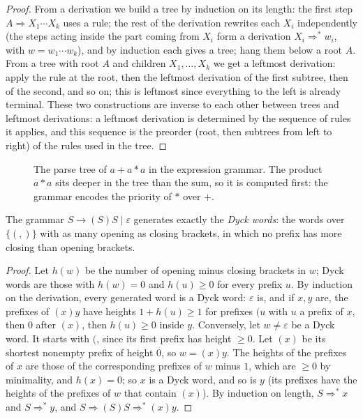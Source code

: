 \begin{proof}
From a derivation we build a tree by induction on its length: the first step $A\Rightarrow X_1\cdots X_k$ uses a rule; the rest of the derivation rewrites each $X_i$ independently (the steps acting inside the part coming from $X_i$ form a derivation $X_i\Rightarrow^*w_i$, with $w=w_1\cdots w_k$), and by induction each gives a tree; hang them below a root $A$. From a tree with root $A$ and children $X_1,\dots,X_k$ we get a leftmost derivation: apply the rule at the root, then the leftmost derivation of the first subtree, then of the second, and so on; this is leftmost since everything to the left is already terminal. These two constructions are inverse to each other between trees and leftmost derivations: a leftmost derivation is determined by the sequence of rules it applies, and this sequence is the preorder (root, then subtrees from left to right) of the rules used in the tree.
\end{proof}

\begin{figure}[ht]
\centering
{}
\caption{The parse tree of $a+a*a$ in the expression grammar. The product $a*a$ sits deeper in the tree than the sum, so it is computed first: the grammar encodes the priority of $*$ over $+$.}
\label{fig:parsetree}
\end{figure}

\begin{proposition}\label{prop:dyck}
The grammar $S\to(S)S\mid\varepsilon$ generates exactly the \emph{Dyck words}: the words over $\{(,)\}$ with as many opening as closing brackets, in which no prefix has more closing than opening brackets.
\end{proposition}

\begin{proof}
Let $h(w)$ be the number of opening minus closing brackets in $w$; Dyck words are those with $h(w)=0$ and $h(u)\ge0$ for every prefix $u$. By induction on the derivation, every generated word is a Dyck word: $\varepsilon$ is, and if $x,y$ are, the prefixes of $(x)y$ have heights $1+h(u)\ge1$ for prefixes $(u$ with $u$ a prefix of $x$, then $0$ after $(x)$, then $h(u)\ge0$ inside $y$. Conversely, let $w\ne\varepsilon$ be a Dyck word. It starts with $($, since its first prefix has height $\ge0$. Let $(x)$ be its shortest nonempty prefix of height $0$, so $w=(x)y$. The heights of the prefixes of $x$ are those of the corresponding prefixes of $w$ minus $1$, which are $\ge0$ by minimality, and $h(x)=0$; so $x$ is a Dyck word, and so is $y$ (its prefixes have the heights of the prefixes of $w$ that contain $(x)$). By induction on length, $S\Rightarrow^*x$ and $S\Rightarrow^*y$, and $S\Rightarrow(S)S\Rightarrow^*(x)y$.
\end{proof}

